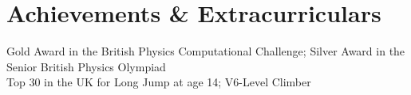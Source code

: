 \section{Achievements \& Extracurriculars}
\begin{itemize}[leftmargin=0.15in, label={}]
\small{\item{
    {Gold Award in the British Physics Computational Challenge; Silver Award in the Senior British Physics Olympiad}\\
    {Top 30 in the UK for Long Jump at age 14; V6-Level Climber}
}}
\end{itemize}